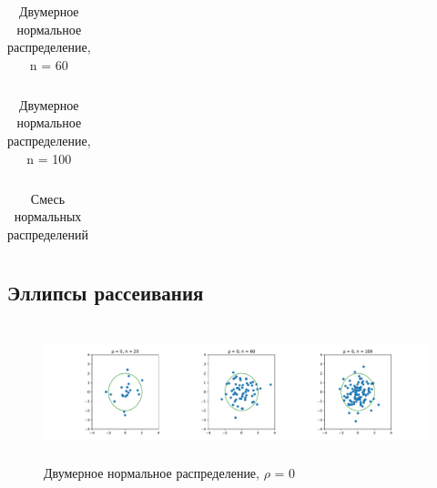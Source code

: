 \documentclass[a4paper]{article}
\begin{document}
            \begin{table}[H]
                \centering
                \begin{tabular}{| c | c | c | c |}
                     \hline
                    
                \end{tabular}{}
                \caption{Двумерное нормальное распределение, n = 60}
                \label{tab:n60}
            \end{table}



            \begin{table}[H]
                \centering
                \begin{tabular}{| c | c | c | c |}
                     \hline
                    
                \end{tabular}{}
                \caption{Двумерное нормальное распределение, n = 100}
                \label{tab:n100}
            \end{table}


            \begin{table}[H]
                \centering
                \begin{tabular}{| c | c | c | c |}
                    \hline
                    
                \end{tabular}{}
                \caption{Смесь нормальных распределений}
                \label{tab:mix_normal}
            \end{table}

        \subsection{Эллипсы рассеивания}
             \begin{figure}[H]
                 \centering
                 \includegraphics[width = 16cm, height = 4cm]{src_lab_5/RHO_0}
                 \caption{Двумерное нормальное распределение, $\rho$ = 0}
                 \label{fig:rho_0}
             \end{figure}
\end{document}
